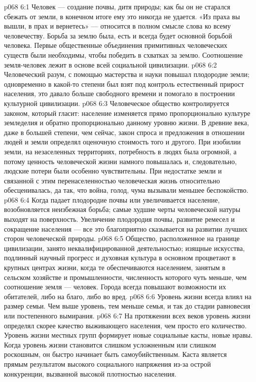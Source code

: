 \vs p068 6:1 Человек --- создание почвы, дитя природы; как бы он не старался сбежать от земли, в конечном итоге ему это никогда не удается. «Из праха вы вышли, в прах и вернетесь» --- относится в полном смысле слова ко всему человечеству. Борьба за землю была, есть и всегда будет основной борьбой человека. Первые общественные объединения примитивных человеческих существ были необходимы, чтобы победить в схватках за землю. Соотношение земля\hyp{}человек лежит в основе всей социальной цивилизации.
\vs p068 6:2 Человеческий разум, с помощью мастерства и науки повышал плодородие земли; одновременно в какой\hyp{}то степени был взят под контроль естественный прирост населения, это давало больше свободного времени и помогало в построении культурной цивилизации.
\vs p068 6:3 \pc Человеческое общество контролируется законом, который гласит: население изменяется прямо пропорционально культуре земледелия и обратно пропорционально данному уровню жизни. В древние века, даже в большей степени, чем сейчас, закон спроса и предложения в отношении людей и земли определял оценочную стоимость того и другого. При изобилии земли, на незаселенных территориях, потребность в людях была огромной, а потому ценность человеческой жизни намного повышалась и, следовательно, людские потери были особенно чувствительны. При недостатке земли и связанной с этим перенаселенностью человеческая жизнь относительно обесценивалась, да так, что война, голод, чума вызывали меньшее беспокойство.
\vs p068 6:4 Когда падает плодородие почвы или увеличивается население, возобновляется неизбежная борьба; самые худшие черты человеческой натуры выходят на поверхность. Увеличение плодородия почвы, развитие ремесел и сокращение населения --- все это благоприятно сказывается на развитии лучших сторон человеческой природы.
\vs p068 6:5 \pc Общество, расположенное на границе цивилизации, занято неквалифицированной деятельностью; изящные искусства, подлинный научный прогресс и духовная культура в основном процветают в крупных центрах жизни, когда те обеспечиваются населением, занятым в сельском хозяйстве и промышленности, численность которого чуть меньше, чем соотношение земля --- человек. Города всегда повышают возможности их обитателей, либо на благо, либо во вред.
\vs p068 6:6 Уровень жизни всегда влиял на размер семьи. Чем выше уровень, тем меньше семья, и так до стадии равновесия или постепенного вымирания.
\vs p068 6:7 На протяжении всех веков уровень жизни определял скорее качество выживающего населения, чем просто его количество. Уровень жизни местных групп формирует новые социальные касты, новые нравы. Когда уровень жизни становится слишком усложненным или слишком роскошным, он быстро начинает быть самоубийственным. Каста является прямым результатом высокого социального напряжения из\hyp{}за острой конкуренции, вызванной высокой плотностью населения.

